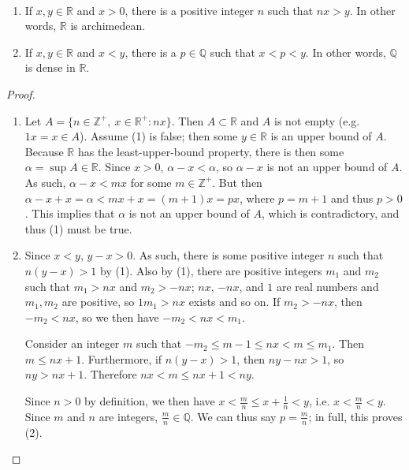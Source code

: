 \documentclass[12pt]{article}
\begin{document}
\begin{thm} \label{thm:rarchqdenseinr}
  \
  \begin{enumerate}
    \item
      If $x,y \in \mathbb{R}$ and $x > 0$, there is a positive integer $n$ such that
      $nx > y$. In other words, $\mathbb{R}$ is archimedean.
    \item
      If $x,y \in \mathbb{R}$ and $x < y$, there is a $p \in \mathbb{Q}$ such that $x
      < p < y$. In other words, $\mathbb{Q}$ is dense in $\mathbb{R}$.
  \end{enumerate}

  \begin{proof}
    \
    \begin{enumerate}
      \item
        Let $A = \{n \in \mathbb{Z}^+,\ x \in \mathbb{R}^+: nx\}$. Then $A \subset
        \mathbb{R}$ and $A$ is not empty (e.g. $1x = x \in A$). Assume (1) is false;
        then some $y \in \mathbb{R}$ is an upper bound of $A$. Because $\mathbb{R}$
        has the least-upper-bound property, there is then some $\alpha = \sup A \in
        \mathbb{R}$. Since $x > 0$, $\alpha - x < \alpha$, so $\alpha - x$ is not an
        upper bound of $A$. As such, $\alpha - x < mx$ for some $m \in \mathbb{Z}^+$.
        But then $\alpha - x + x = \alpha < mx + x = (m + 1)x = px$, where $p = m +
        1$ and thus $p > 0$. This implies that $\alpha$ is not an upper bound of $A$,
        which is contradictory, and thus (1) must be true.

      \item
        Since $x < y$, $y - x > 0$. As such, there is some positive integer $n$ such
        that $n(y - x) > 1$ by (1).  Also by (1), there are positive integers $m_1$
        and $m_2$ such that $m_1 > nx$ and $m_2 > -nx$; $nx$, $-nx$, and $1$ are real
        numbers and $m_1,m_2$ are positive, so $1m_1 > nx$ exists and so on. If $m_2
        > -nx$, then $-m_2 < nx$, so we then have $-m_2 < nx < m_1$.

        Consider an integer $m$ such that $-m_2 \leq m - 1 \leq nx < m \leq m_1$.
        Then $m \leq nx + 1$. Furthermore, if $n(y - x) > 1$, then $ny - nx > 1$, so
        $ny > nx + 1$. Therefore $nx < m \leq nx + 1 < ny$.

        Since $n > 0$ by definition, we then have $x < \frac{m}{n} \leq x +
        \frac{1}{n} < y$, i.e. $x < \frac{m}{n} < y$. Since $m$ and $n$ are integers,
        $\frac{m}{n} \in \mathbb{Q}$. We can thus say $p = \frac{m}{n}$; in full,
        this proves (2).
    \end{enumerate}
  \end{proof}
\end{thm}
\end{document}
